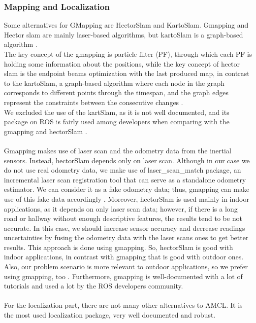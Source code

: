 \subsubsection{Mapping and Localization}
\label{des_loc_map}
Some alternatives for GMapping are HectorSlam and KartoSlam. Gmapping and Hector slam are mainly laser-based algorithms, but kartoSlam is a graph-based algorithm \cite{6719348}. \\
The key concept of the gmapping is particle filter (PF), through which each PF is holding some information about the positions, while the key concept of hector slam is the endpoint beams optimization with the last produced map, in contrast to the kartoSlam, a graph-based algorithm where each node in the graph corresponds to different points through the timespan, and the graph edges represent the constraints between the consecutive changes \cite{4084563}\cite{5681215}. \\
We excluded the use of the kartSlam, as it is not well documented, and its package on ROS is fairly used among developers when comparing with the gmapping and hectorSlam \cite{mikeferguson}.\\
\\
Gmapping makes use of laser scan and the odometry data from the inertial sensors. Instead, hectorSlam depends only on laser scan. Although in our case we do not use real odometry data, we make use of laser\_scan\_match package, an incremental laser scan registration tool that can serve as a standalone odometry estimator\cite{laserScanMatch}\cite{4543181}. We can consider it as a fake odometry data; thus, gmapping can make use of this fake data accordingly \cite{Czech_master_thesis}. Moreover, hectorSlam is used mainly in indoor applications, as it depends on only laser scan data; however, if there is a long road or hallway without enough descriptive features, the results tend to be not accurate. In this case, we should increase sensor accuracy and decrease  readings uncertainties by fusing the odometry data with the laser scans ones to get better results. This approach is done using gmapping. 
So, hectorSlam is good with indoor applications, in contrast with gmapping that is good with outdoor ones. Also, our problem scenario is more relevant to outdoor applications, so we prefer using gmapping, too \cite{hector_vs_gmapping}\cite{hector_vs_gmapping_2}. Furthermore, gmapping is well-documented with a lot of tutorials and used a lot by the ROS developers community.\\
\\
For the localization part, there are not many other alternatives to AMCL. It is the most used localization package, very well documented and robust. 

